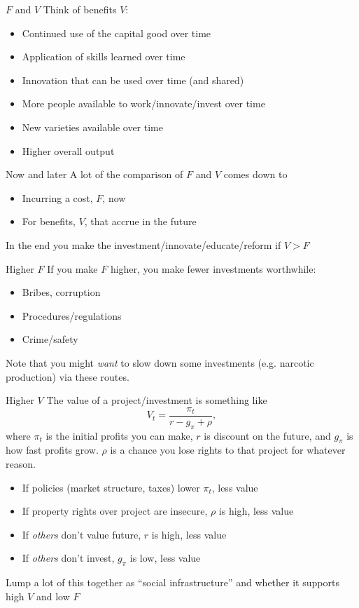 \begin{frame}{$F$ and $V$}
Think of benefits $V$:
\begin{itemize}
	\item Continued use of the capital good over time
	\item Application of skills learned over time
	\item Innovation that can be used over time (and shared)
	\item More people available to work/innovate/invest over time
	\item New varieties available over time
	\item Higher overall output
\end{itemize}
\end{frame}

\begin{frame}{Now and later}
A lot of the comparison of $F$ and $V$ comes down to
\begin{itemize}
	\item Incurring a cost, $F$, now
	\item For benefits, $V$, that accrue in the future
\end{itemize}
In the end you make the investment/innovate/educate/reform if $V > F$
\end{frame}

\begin{frame}{Higher $F$}
If you make $F$ higher, you make fewer investments worthwhile:
\begin{itemize}
	\item Bribes, corruption
	\item Procedures/regulations
	\item Crime/safety
\end{itemize}
Note that you might \textit{want} to slow down some investments (e.g. narcotic production) via these routes.
\end{frame}

\begin{frame}{Higher $V$}
The value of a project/investment is something like
\begin{equation}
	V_t = \frac{\pi_t}{r-g_{\pi}+\rho}, \nonumber
\end{equation}
where $\pi_t$ is the initial profits you can make, $r$ is discount on the future, and $g_{\pi}$ is how fast profits grow. $\rho$ is a chance you lose rights to that project for whatever reason. 
\begin{itemize}
	\item If policies (market structure, taxes) lower $\pi_t$, less value
	\item If property rights over project are insecure, $\rho$ is high, less value
	\item If \textit{others} don't value future, $r$ is high, less value
	\item If \textit{others} don't invest, $g_{\pi}$ is low, less value
\end{itemize}
Lump a lot of this together as ``social infrastructure'' and whether it supports high $V$ and low $F$
\end{frame}

